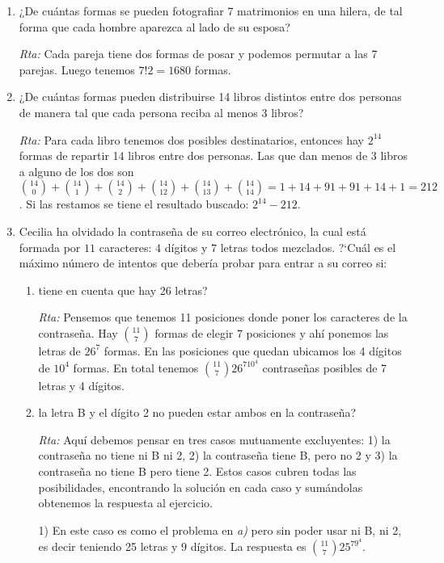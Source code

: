 \documentclass[12pt,spanish,makeidx]{amsbook}
\begin{document}
\begin{enumerate}
\medskip

\item ¿De cuántas formas se pueden fotografiar 7 matrimonios en una hilera, de tal forma
que cada hombre aparezca al lado de su esposa?

\noindent\textit{Rta:} Cada pareja tiene dos formas de posar y podemos permutar a las 7 parejas. Luego tenemos $7!2=1680$ formas.

\medskip

\item ¿De cuántas formas pueden distribuirse 14 libros distintos entre dos personas de
manera tal que cada persona reciba al menos 3 libros?

\noindent\textit{Rta:} Para cada libro tenemos dos posibles destinatarios, entonces hay $2^{14}$ formas de repartir 14 libros entre dos personas.  Las que dan menos de 3 libros a alguno de los dos son $\binom{14}{0}+\binom{14}{1}+\binom{14}{2}+\binom{14}{12}+\binom{14}{13}+\binom{14}{14}=1+14+91+91+14+1=212$. Si las restamos se tiene el resultado buscado: $2^{14}-212$.

\smallskip

\item
Cecilia ha olvidado la contraseña de su correo electrónico, la cual est\'a formada por $11$ caracteres: $4$ d\'igitos y $7$ letras todos mezclados. ?`Cu\'al es el m\'aximo n\'umero de intentos que deber\'ia probar para entrar a su correo si:
\begin{enumerate}
	\item  tiene en cuenta que hay 26 letras?
	
	\textit{Rta:} Pensemos que tenemos 11 posiciones donde poner los caracteres de la contraseña. Hay $\binom{11}{7}$ formas de elegir 7 posiciones y ahí ponemos las letras de $26^7$ formas. En  las  posiciones que quedan ubicamos los 4 dígitos de $10^4$ formas. En total tenemos $\binom{11}{7}26^710^4$   contraseñas posibles de 7 letras y 4 dígitos.
	
	\item la letra B y el d\'igito 2 no pueden estar ambos en la contraseña?
	
	\textit{Rta:} Aquí debemos pensar en  tres casos mutuamente excluyentes: 1) la contraseña no tiene ni B ni 2, 2) la contraseña tiene B, pero no 2 y 3) la contraseña no tiene B pero tiene 2. Estos casos cubren todas las posibilidades,  encontrando  la solución en cada caso y sumándolas obtenemos la respuesta al ejercicio.
	
	1) En  este caso es como  el problema en \textit{a)} pero sin poder usar ni B, ni 2,  es decir teniendo 25 letras y 9 dígitos. La respuesta es $\binom{11}{7}25^79^4$.
	

\end{enumerate}
\end{enumerate}
\end{document}
